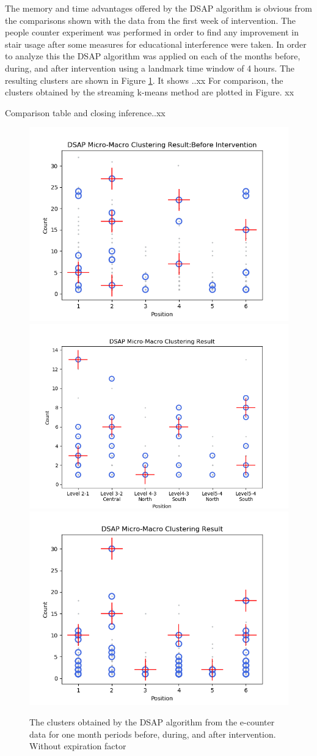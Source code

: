 \documentclass[../UNBThesis2.tex]{subfiles}
\begin{document}
The memory and time advantages offered by the DSAP algorithm is obvious from the comparisons shown with the data from the first week of intervention. The people counter experiment was performed in order to find any improvement in stair usage after some measures for educational interference were taken. In order to analyze this the DSAP algorithm was applied on each of the months before, during, and after intervention using a landmark time window of 4 hours. The resulting clusters are shown in Figure \ref{dsap3mon}. It shows ..xx
For comparison, the clusters obtained by the streaming k-means method are plotted in Figure. xx

Comparison table and closing inference..xx
\begin{figure}[!h]
    \centering
    \includegraphics[width=.47\textwidth]{image/Chapters/Chapter6/DSAPBeforeMonthIntervention.png}
    \includegraphics[width=.51\textwidth]{image/Chapters/Chapter6/window10H.png}
    \includegraphics[width=.49\textwidth]{image/Chapters/Chapter6/DSAPAFTERmonthIntervention.png}
    \caption{The clusters obtained by the DSAP algorithm from the e-counter data for one month periods before, during, and after intervention. Without expiration factor}
    \label{dsap3mon}
\end{figure}
\end{document}
